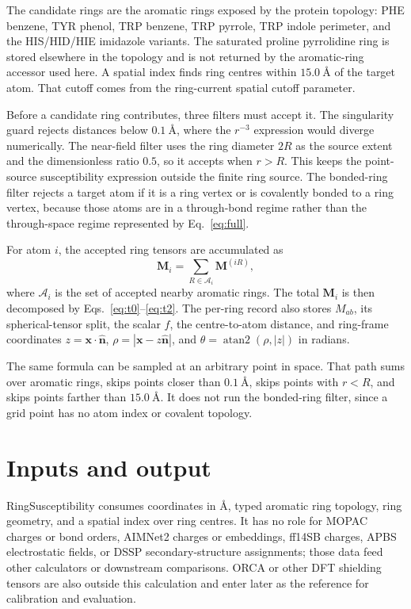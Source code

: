 \documentclass[11pt]{article}
\begin{document}
The candidate rings are the aromatic rings exposed by the protein topology:
PHE benzene, TYR phenol, TRP benzene, TRP pyrrole, TRP indole perimeter, and the
HIS/HID/HIE imidazole variants. The saturated proline pyrrolidine ring is stored
elsewhere in the topology and is not returned by the aromatic-ring accessor used
here. A spatial index finds ring centres within \(\SI{15.0}{\angstrom}\) of the
target atom. That cutoff comes from the ring-current spatial cutoff parameter.

Before a candidate ring contributes, three filters must accept it. The
singularity guard rejects distances below \(\SI{0.1}{\angstrom}\), where the
\(r^{-3}\) expression would diverge numerically. The near-field filter uses
the ring diameter \(2R\) as the source extent and the dimensionless ratio
\(0.5\), so it accepts when \(r>R\). This keeps the point-source
susceptibility expression outside the finite ring source. The bonded-ring
filter rejects a target atom if it is a ring vertex or is covalently bonded to
a ring vertex, because those atoms are in a through-bond regime rather than the
through-space regime represented by Eq.~\eqref{eq:full}.

For atom \(i\), the accepted ring tensors are accumulated as
\begin{equation}
  \bm M_i = \sum_{R\in\mathcal A_i} \bm M^{(iR)} ,
  \label{eq:sum}
\end{equation}
where \(\mathcal A_i\) is the set of accepted nearby aromatic rings. The total
\(\bm M_i\) is then decomposed by Eqs.~\eqref{eq:t0}--\eqref{eq:t2}. The
per-ring record also stores \(M_{ab}\), its spherical-tensor split, the scalar
\(f\), the centre-to-atom distance, and ring-frame coordinates
\(z=\bm x\cdot\hat{\bm n}\), \(\rho=|\bm x-z\hat{\bm n}|\), and
\(\theta=\operatorname{atan2}(\rho,|z|)\) in radians.

The same formula can be sampled at an arbitrary point in space. That path sums
over aromatic rings, skips points closer than \(\SI{0.1}{\angstrom}\), skips
points with \(r<R\), and skips points farther than \(\SI{15.0}{\angstrom}\).
It does not run the bonded-ring filter, since a grid point has no atom index or
covalent topology.

\section{Inputs and output}

RingSusceptibility consumes coordinates in \(\si{\angstrom}\), typed aromatic
ring topology, ring geometry, and a spatial index over ring centres. It has no
role for MOPAC charges or bond orders, AIMNet2 charges or embeddings, ff14SB
charges, APBS electrostatic fields, or DSSP secondary-structure assignments;
those data feed other calculators or downstream comparisons. ORCA or other DFT
shielding tensors are also outside this calculation and enter later as the
reference for calibration and evaluation.
\end{document}
